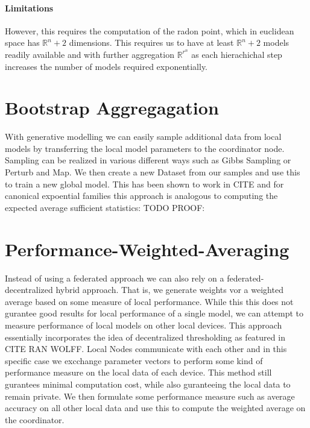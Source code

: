 \paragraph*{Limitations}
However, this requires the computation of the radon point, which in euclidean space has $\mathbb{R}^n + 2$ dimensions.
This requires us to have at least $\mathbb{R}^n + 2$ models readily available and with further aggregation $\mathbb{R}^{r^n}$ as each hierachichal step increases the number of models required exponentially.

\section{Bootstrap Aggregagation}
With generative modelling we can easily sample additional data from local models by transferring the local model parameters to the coordinator node.
Sampling can be realized in various different ways such as Gibbs Sampling or Perturb and Map.
We then create a new Dataset from our samples and use this to train a new global model. 
This has been shown to work in CITE and for canonical expoential families this approach is analogous to computing the expected average sufficient statistics:
TODO PROOF:


\section{Performance-Weighted-Averaging}
Instead of using a federated approach we can also rely on a federated-decentralized hybrid approach. 
That is, we generate weights vor a weighted average based on some measure of local performance.
While this this does not gurantee good results for local performance of a single model, we can attempt to measure performance of local models on other local devices.
This approach essentially incorporates the idea of decentralized thresholding as featured in CITE RAN WOLFF.
Local Nodes communicate with each other and in this specific case we excchange parameter vectors to perform some kind of performance measure on the local data of each device.
This method still gurantees minimal computation cost, while also guranteeing the local data to remain private.
We then formulate some performance measure such as average accuracy on all other local data and use this to compute the weighted average on the coordinator.
